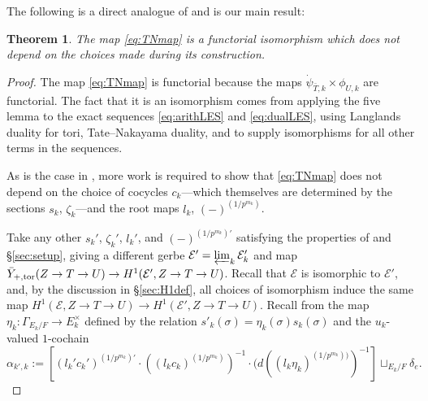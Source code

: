 \documentclass{amsart}
\newtheorem{theorem}[result]{Theorem}
\theoremstyle{definition}
\theoremstyle{remark}
\begin{document}
The following is a direct analogue of \cite[Proposition 5.7]{Kal26b} and is our main result:
\begin{theorem}\label{thm:TN}
    The map \eqref{eq:TNmap} is a functorial isomorphism which does not depend on the choices made during its construction.
\end{theorem}

\begin{proof}
The map \eqref{eq:TNmap} is functorial because the maps $\dot{\psi}_{\bar{T},k} \times \phi_{U,k}$ are functorial. The fact that it is an isomorphism comes from applying the five lemma to the exact sequences \eqref{eq:arithLES} and \eqref{eq:dualLES}, using Langlands duality for tori, Tate--Nakayama duality, and \cite[Theorem 4.10]{Dillery1} to supply isomorphisms for all other terms in the sequences. 

As is the case in \cite{Kal26b}, more work is required to show that \eqref{eq:TNmap} does not depend on the choice of cocycles $c_{k}$---which themselves are determined by the sections $s_{k}$, $\zeta_{k}$---and the root maps $l_{k}$, $(-)^{(1/p^{m_{k}})}$.

Take any other $s_{k}'$, $\zeta_{k}'$, $l_{k}'$, and $(-)^{(1/p^{m_{k}})'}$ satisfying the properties of \cite[\S 4.4]{kaletha16} and \S \ref{sec:setup}, giving a different gerbe $\mathcal{E}' = \varprojlim_{k} \mathcal{E}'_{k}$ and map $ \bar{Y}_{+,\textnormal{tor}}(Z \to T \to U) \to H^{1}(\mathcal{E}', Z \to T \to U)$. Recall that $\mathcal{E}$ is isomorphic to $\mathcal{E}'$, and, by the discussion in \S \ref{sec:H1def}, all choices of isomorphism induce the same map $H^{1}(\mathcal{E}, Z \to T \to U) \to  H^{1}(\mathcal{E}', Z \to T \to U)$. Recall from \cite{Kal26b} the map $\eta_{k} \colon \Gamma_{E_{k}/F} \to E_{k}^{\times}$ defined by the relation $s'_{k}(\sigma)=\eta_{k}(\sigma)s_{k}(\sigma)$ and the $u_{k}$-valued $1$-cochain
\begin{equation*}
\alpha_{k',k}:=[(l_{k}'c_{k}')^{(1/p^{m_{k}})'} \cdot ((l_{k}c_{k})^{(1/p^{m_{k}})})^{-1} \cdot (d((l_{k}\eta_{k})^{(1/p^{m_{k}}))})^{-1}] \sqcup_{E_{k}/F} \delta_{e}.
\end{equation*}


\end{proof}
\end{document}
